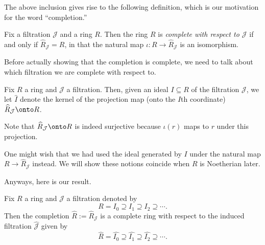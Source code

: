 The above inclusion gives rise to the following definition, which is our motivation for the word ``completion.''
\begin{definition}[Complete]
	Fix a filtration $\mathcal J$ and a ring $R$. Then the ring $R$ is \textit{complete with respect to $\mathcal J$} if and only if $\widehat R_\mathcal J=R$, in that the natural map $\iota:R\to\widehat R_\mathcal J$ is an isomorphism.
\end{definition}
Before actually showing that the completion is complete, we need to talk about which filtration we are complete with respect to.
\begin{notation}
	Fix $R$ a ring and $\mathcal J$ a filtration. Then, given an ideal $I\subseteq R$ of the filtration $\mathcal J$, we let $\widehat I$ denote the kernel of the projection map (onto the $I$th coordinate) $\widehat R_\mathcal J\onto R$.
\end{notation}
Note that $\widehat R_\mathcal J\onto R$ is indeed surjective because $\iota(r)$ maps to $r$ under this projection.
\begin{remark}
	One might wish that we had used the ideal generated by $I$ under the natural map $R\to\widehat R_\mathcal J$ instead. We will show these notions coincide when $R$ is Noetherian later.
\end{remark}
Anyways, here is our result.
\begin{lemma}
	Fix $R$ a ring and $\mathcal J$ a filtration denoted by
	\[R=I_0\supseteq I_1\supseteq I_2\supseteq\cdots.\]
	Then the completion $\widehat R:=\widehat R_\mathcal J$ is a complete ring with respect to the induced filtration $\widehat{\mathcal J}$ given by
	\[\widehat R=\widehat{I_0}\supseteq \widehat{I_1}\supseteq \widehat{I_2}\supseteq\cdots.\]
\end{lemma}
